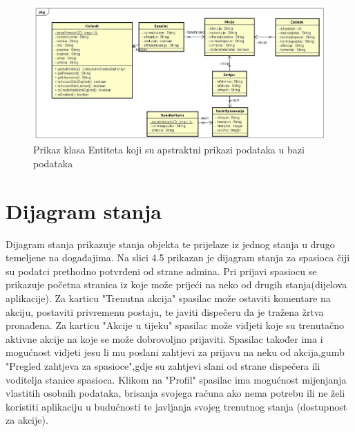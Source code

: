 	\begin{figure}[h!]
		\centering
		\includegraphics[width=\linewidth]{./slike/Entiteti.jpg}
		\caption{Prikaz klasa Entiteta koji su apstraktni prikazi podataka u bazi podataka}
		
	\end{figure}

	\eject
	
	\newpage
	\section{Dijagram stanja}
	
		{Dijagram stanja prikazuje stanja objekta te prijelaze iz jednog stanja u drugo temeljene na događajima. Na slici 4.5 prikazan je dijagram stanja za spasioca čiji su podatci prethodno potvrđeni od strane admina. Pri prijavi spasiocu se prikazuje početna stranica iz koje može prijeći na neko od drugih stanja(dijelova aplikacije). Za karticu "Trenutna akcija" spasilac može ostaviti komentare na akciju, postaviti privremenu postaju, te javiti dispečeru da je tražena žrtva pronađena. Za karticu "Akcije u tijeku" spasilac može vidjeti koje su trenutačno aktivne akcije na koje se može dobrovoljno prijaviti. Spasilac također ima i mogućnost vidjeti jesu li mu poslani zahtjevi za prijavu na neku od akcija,gumb "Pregled zahtjeva za spasioce",gdje su zahtjevi slani od strane dispečera ili voditelja stanice spasioca. Klikom na "Profil" spasilac ima mogućnost mijenjanja vlastitih osobnih podataka, brisanja svojega računa ako nema potrebu ili ne želi koristiti aplikaciju u budućnosti te javljanja svojeg trenutnog stanja (dostupnost za akcije).}
	
